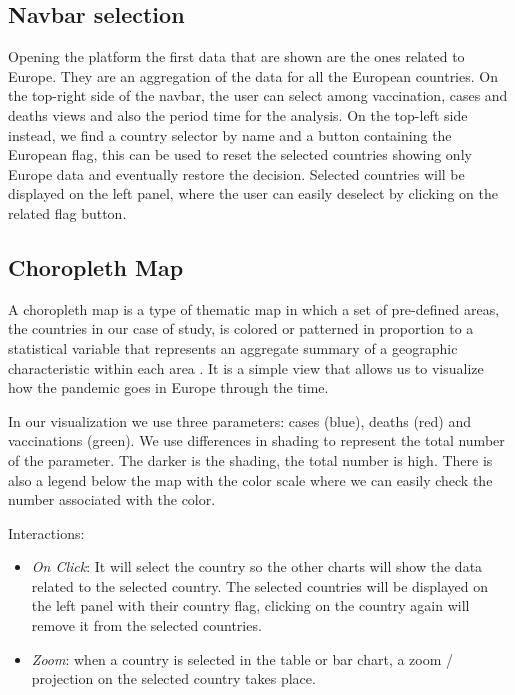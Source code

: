 \documentclass[10pt,conference]{IEEEtran}
\begin{document}
\subsection{Navbar selection}
Opening the platform the first data that are shown are the ones related to Europe. They are an aggregation of the data for all the European countries.
On the top-right side of the navbar, the user can select among vaccination, cases and deaths views and also the period time for the analysis. On the top-left side instead, we find a country selector by name and a button containing the European flag, this can be used to reset the selected countries showing only Europe data and eventually restore the decision. Selected countries will be displayed on the left panel, where the user can easily deselect by clicking on the related flag button.

\subsection{Choropleth Map}
A choropleth map is a type of thematic map in which a set of pre-defined areas, the countries in our case of study, is colored or patterned in proportion to a statistical variable that represents an aggregate summary of a geographic characteristic within each area \cite{map}. It is a simple view that allows us to visualize how the pandemic goes in Europe through the time. 

In our visualization we use three parameters: cases (blue), deaths (red) and vaccinations (green). We use differences in shading to represent the total number of the parameter. The darker is the shading, the total number is high. There is also a legend below the map with the color scale where we can easily check the number associated with the color.

Interactions:
\begin{itemize}
 \item {\em On Click}: It will select the country so the other charts will show the data related to the selected country. The selected countries will be displayed on the left panel with their country flag, clicking on the country again will remove it from the selected countries.
 \item {\em Zoom}: when a country is selected in the table or bar chart, a zoom / projection on the selected country takes place.
\end{itemize}
\end{document}
